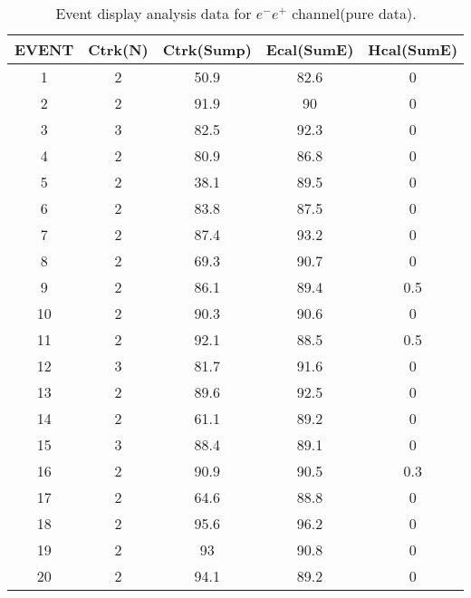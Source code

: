\begin{table}[h!]
    \centering
    \caption{Event display analysis data for $e^-e^+$ channel(pure data).}
    \begin{tabular}{ccccc}
    \hline
    EVENT & Ctrk(N) & Ctrk(Sump) & Ecal(SumE) & Hcal(SumE) \\ \hline
    1     & 2       & 50.9       & 82.6       & 0          \\
    2     & 2       & 91.9       & 90         & 0          \\
    3     & 3       & 82.5       & 92.3       & 0          \\
    4     & 2       & 80.9       & 86.8       & 0          \\
    5     & 2       & 38.1       & 89.5       & 0          \\
    6     & 2       & 83.8       & 87.5       & 0          \\
    7     & 2       & 87.4       & 93.2       & 0          \\
    8     & 2       & 69.3       & 90.7       & 0          \\
    9     & 2       & 86.1       & 89.4       & 0.5        \\
    10    & 2       & 90.3       & 90.6       & 0          \\
    11    & 2       & 92.1       & 88.5       & 0.5        \\
    12    & 3       & 81.7       & 91.6       & 0          \\
    13    & 2       & 89.6       & 92.5       & 0          \\
    14    & 2       & 61.1       & 89.2       & 0          \\
    15    & 3       & 88.4       & 89.1       & 0          \\
    16    & 2       & 90.9       & 90.5       & 0.3        \\
    17    & 2       & 64.6       & 88.8       & 0          \\
    18    & 2       & 95.6       & 96.2       & 0          \\
    19    & 2       & 93         & 90.8       & 0          \\
    20    & 2       & 94.1       & 89.2       & 0         \\ \hline
    \end{tabular}
    \label{table:ed-ee}
\end{table}
    
